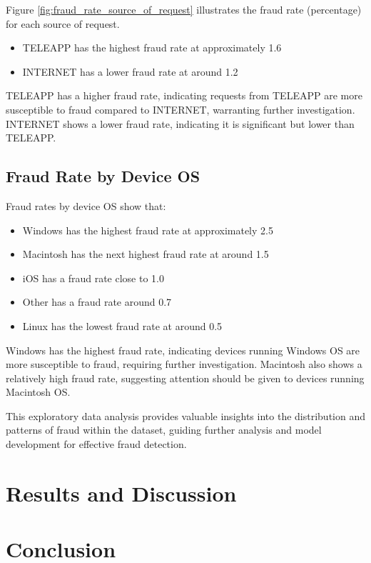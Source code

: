 \documentclass[12pt,a4paper]{report}
\begin{document}
Figure \ref{fig:fraud_rate_source_of_request} illustrates the fraud rate (percentage) for each source of request. 

\begin{itemize}
    \item TELEAPP has the highest fraud rate at approximately 1.6%
    \item INTERNET has a lower fraud rate at around 1.2%
\end{itemize}

TELEAPP has a higher fraud rate, indicating requests from TELEAPP are more susceptible to fraud compared to INTERNET, warranting further investigation. INTERNET shows a lower fraud rate, indicating it is significant but lower than TELEAPP.

\section{Fraud Rate by Device OS}

Fraud rates by device OS show that:

\begin{itemize}
    \item Windows has the highest fraud rate at approximately 2.5%
    \item Macintosh has the next highest fraud rate at around 1.5%
    \item iOS has a fraud rate close to 1.0%
    \item Other has a fraud rate around 0.7%
    \item Linux has the lowest fraud rate at around 0.5%
\end{itemize}

Windows has the highest fraud rate, indicating devices running Windows OS are more susceptible to fraud, requiring further investigation. Macintosh also shows a relatively high fraud rate, suggesting attention should be given to devices running Macintosh OS.

This exploratory data analysis provides valuable insights into the distribution and patterns of fraud within the dataset, guiding further analysis and model development for effective fraud detection.









\chapter{Results and Discussion}





\chapter{Conclusion}





\end{document}
